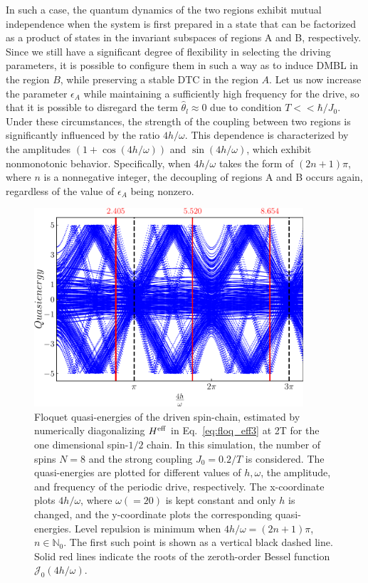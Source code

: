 \documentclass[12pt]{iopart}
\begin{document}
In such a case, the quantum dynamics of the two regions exhibit mutual independence when the system is first prepared in a state that can be factorized as a product of states in the invariant subspaces of regions A and B, respectively. Since we still have a significant degree of flexibility in selecting the driving parameters, it is possible to configure them in such a way as to induce DMBL in the region $B$, while preserving a stable DTC in the region $A$. Let us now increase the parameter $\epsilon_A$ while maintaining a sufficiently high frequency for the drive, so that it is possible to disregard the term $\hat{\theta}_l \approx 0$ due to condition $T<<\hbar/J_0$. Under these circumstances, the strength of the coupling between two regions is significantly influenced by the ratio $4h/\omega$. This dependence is characterized by the amplitudes $(1+\cos(4h/\omega))$ and $\sin(4h/\omega)$, which exhibit nonmonotonic behavior. Specifically, when $4h/\omega$ takes the form of $(2n+1)\pi$, where $n$ is a nonnegative integer, the decoupling of regions A and B occurs again, regardless of the value of $\epsilon_A$ being nonzero.
\begin{figure}[h!]
    \centering
    \includegraphics[width=10cm]{quasienergy_8_lowres.pdf}
    \caption{Floquet quasi-energies of the driven spin-chain,  estimated by numerically diagonalizing $H^{\rm eff}$ in Eq.~\eqref{eq:floq_eff3} at 2T for the one dimensional spin-$1/2$ chain. In this simulation, the number of spins $N=8$ and the strong coupling $J_0=0.2/T$ is considered. The quasi-energies are plotted for different values of $h,\omega$, the amplitude, and frequency of the periodic drive, respectively.  The x-coordinate plots ${4h}/{\omega}$, where $\omega( = 20)$ is kept constant and only $h$ is changed, and the y-coordinate plots the corresponding quasi-energies. Level repulsion is minimum when ${4h}/{\omega} = (2n+1)\pi$, $n\in \mathbb{N}_0$. The first such point is shown as a vertical black dashed line. Solid red lines indicate the roots of the zeroth-order Bessel function $\mathcal{J}_0(4h/\omega)$.}
    \label{Fig:quasienergy_new}
\end{figure}	
\end{document}
